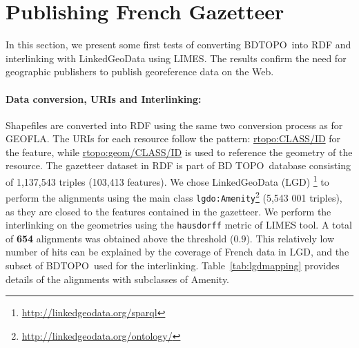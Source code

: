 \section{Publishing  French Gazetteer} \label{sec:bdtopo}

In this section, we present some first tests of converting BDTOPO\circledR ~into RDF and interlinking with LinkedGeoData using LIMES. The results confirm the need for geographic publishers to publish georeference data on the Web. 

\paragraph{Data conversion, URIs and Interlinking:}
Shapefiles are converted into RDF using the same two conversion process as for GEOFLA\circledR. The URIs for each resource follow the pattern: \url{rtopo:CLASS/ID} for the feature, while  \url{rtopo:geom/CLASS/ID} is used to reference the geometry of the resource.
The gazetteer dataset in RDF is part of BD TOPO\circledR ~database consisting of  1,137,543 triples (103,413 features). We chose LinkedGeoData (LGD)
\footnote{\url{http://linkedgeodata.org/sparql}} to perform the alignments using the main class \texttt{lgdo:Amenity}\footnote{\url{http://linkedgeodata.org/ontology/}} (5,543 001 triples), as they are closed to the features contained in the gazetteer. We perform the interlinking on the geometries using the \texttt{hausdorff} metric of LIMES tool. A total of \textbf{654} alignments was obtained above the threshold ($0.9$). This relatively low number of hits can be explained by the coverage of French data in LGD, and the subset of BDTOPO\circledR  ~used for the interlinking. Table~\ref{tab:lgdmapping} provides details of the alignments with subclasses of Amenity.

\begin{table}[!htbp]
\end{table}


